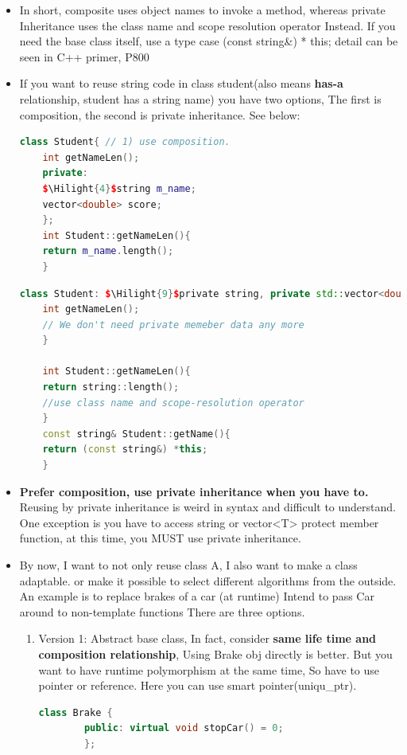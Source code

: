 \documentclass[a4paper,12pt,twoside]{book}
\newcommand{\Hilight}[1]{\makebox[0pt][l]{\color{yellow}\rule[-3pt]{#1em}{11pt}}}
\begin{document}
\begin{itemize}
	\item In short, composite uses object names to invoke a method, whereas private Inheritance uses the class name and scope resolution operator Instead. If you need the base class itself, use a type case (const string\&) * this; detail can be seen in C++ primer, P800
	
	\item If you want to reuse string code in class student(also means \textbf{has-a} relationship, student has a string name) you have two options, The first is composition,  the second is private inheritance. See below:
	\begin{lstlisting}[frame=single, language=c++, mathescape=true]
	class Student{ // 1) use composition.
	int getNameLen();
	private:
	$\Hilight{4}$string m_name;
	vector<double> score;
	};
	int Student::getNameLen(){
	return m_name.length();
	}
	\end{lstlisting}
	
	\begin{lstlisting}[frame=single, language=c++, mathescape=true]
	class Student: $\Hilight{9}$private string, private std::vector<double>{
	int getNameLen();
	// We don't need private memeber data any more
	}
	
	int Student::getNameLen(){
	return string::length();
	//use class name and scope-resolution operator
	}
	const string& Student::getName(){
	return (const string&) *this;
	}
	\end{lstlisting}
	
	\item \textbf{Prefer composition, use private inheritance when you have to.} Reusing by private inheritance is weird in syntax and difficult to understand. One exception is you have to access string or vector<T> protect member function, at this time, you MUST use private inheritance.
	
	\item By now, I want to not only reuse class A, I also want to make a class adaptable. or make it possible to select different algorithms from the outside.  An example is  to replace brakes of a car (at runtime) Intend to pass Car around to non-template functions There are three options.
	\begin{enumerate}
		\item Version 1: Abstract base class, In fact, consider \textbf{same life time and composition relationship},  Using Brake obj directly is better. But you want to have runtime polymorphism at the same time, So have to use pointer or reference. Here you can use smart pointer(uniqu\_ptr).
		\begin{lstlisting}[frame=single, language=c++]
		class Brake {
		public: virtual void stopCar() = 0;
		};
		

\end{lstlisting}
\end{enumerate}
\end{itemize}
\end{document}
